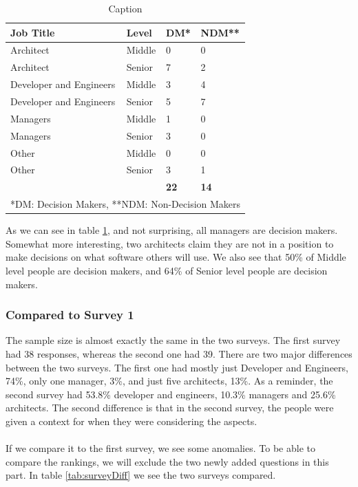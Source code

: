 \documentclass{article}
\begin{document}
\begin{table}[H]
\centering
\begin{tabular}{l l l l}
\textbf{Job Title} & \textbf{Level} & \textbf{DM*} & \textbf{NDM**} \\ \hline
Architect               & Middle & 0               & 0                   \\
Architect               & Senior & 7               & 2                   \\ \hline
Developer and Engineers & Middle & 3               & 4                   \\
Developer and Engineers & Senior & 5               & 7                   \\ \hline
Managers                & Middle & 1               & 0                   \\
Managers                & Senior & 3               & 0                   \\ \hline
Other                   & Middle & 0               & 0                   \\
Other                   & Senior & 3               & 1                   \\ \hdashline
&        &     \textbf{22}          & \textbf{14}              \\ \hline\hline
\multicolumn{4}{l}{*DM: Decision Makers, **NDM: Non-Decision Makers}

\end{tabular}
\caption{Caption}
\label{tab:level}
\end{table}
As we can see in table \ref{tab:level}, and not surprising, all managers are decision makers.
Somewhat more interesting, two architects claim they are not in a
position to make decisions on what software others will use. We also see
that 50\% of Middle level people are decision makers, and 64\% of Senior
level people are decision makers.


\subsubsection{Compared to Survey 1}

The sample size is almost exactly the same in the two surveys. The first
survey had 38 responses, whereas the second one had 39. There are two
major differences between the two surveys. The first one had mostly just
Developer and Engineers, 74\%, only one manager, 3\%, and just five
architects, 13\%. As a reminder, the second survey had 53.8\% developer
and engineers, 10.3\% managers and 25.6\% architects. The second
difference is that in the second survey, the people were given a context
for when they were considering the aspects.
\\ \\
If we compare it to the first survey, we see some anomalies. To be able
to compare the rankings, we will exclude the two newly added questions
in this part. In table \ref{tab:surveyDiff} we see the two surveys compared.
\end{document}
